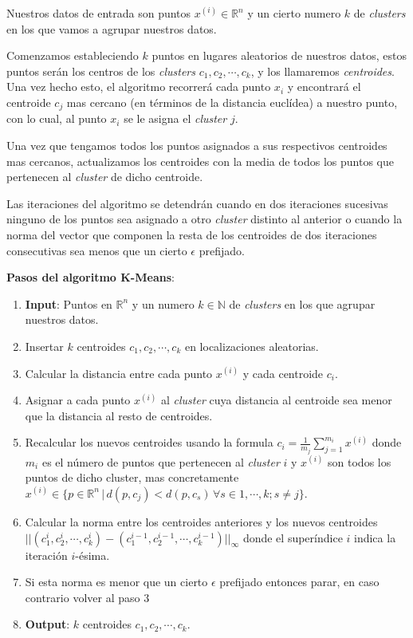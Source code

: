Nuestros datos de entrada son puntos $x^{(i)} \in \mathds{R}^n$ y un cierto numero $k$ de 
\textit{clusters} en los que vamos a agrupar nuestros datos.

Comenzamos estableciendo $k$ puntos en lugares aleatorios de nuestros datos, estos puntos serán los 
centros de los \textit{clusters} $c_1, c_2, \cdots, c_k$, y los llamaremos \textit{centroides}.
Una vez hecho esto, el algoritmo recorrerá cada punto $x_i$ y encontrará el centroide $c_j$ mas 
cercano (en términos de la distancia euclídea) a nuestro punto, con lo cual, al punto $x_i$ se le 
asigna el \textit{cluster} $j$.

Una vez que tengamos todos los puntos asignados a sus respectivos centroides mas cercanos, actualizamos 
los centroides con la media de todos los puntos que pertenecen al \textit{cluster} de dicho centroide.

Las iteraciones del algoritmo se detendrán cuando en dos iteraciones sucesivas ninguno de los puntos 
sea asignado a otro \textit{cluster} distinto al anterior o cuando la norma del vector que componen 
la resta de los centroides de dos iteraciones consecutivas sea menos que un cierto $\epsilon$ 
prefijado.
\newline

\noindent \textbf{Pasos del algoritmo K-Means}:
\begin{enumerate}
  \item \textbf{Input}: Puntos en $\mathds{R}^n$ y un numero $k \in \mathds{N}$ de \textit{clusters}
  en los que agrupar nuestros datos.
  \item Insertar $k$ centroides $c_1, c_2, \cdots, c_k$ en localizaciones aleatorias.
  \item Calcular la distancia entre cada punto $x^{(i)}$ y cada centroide $c_i$.
  \item Asignar a cada punto $x^{(i)}$ al \textit{cluster} cuya distancia al centroide sea menor 
        que la distancia al resto de centroides.
  \item Recalcular los nuevos centroides usando la formula $c_i = \frac{1}{m_j} \sum_{j=1}^{m_i}x^{(i)}$ 
        donde $m_i$ es el número de puntos que pertenecen al \textit{cluster} $i$ y $x^{(i)}$ son 
        todos los puntos de dicho cluster, mas concretamente \\
        $x^{(i)} \in \{ p \in \mathds{R}^n \, | \, d(p, c_j) < d(p, c_s) \, \forall s \in 1, \cdots, k; s \neq j \}$.
  \item Calcular la norma entre los centroides anteriores y los nuevos centroides \\
        $ ||(c_1^i, c_2^i, \cdots, c_k^i) - (c_1^{i-1}, c_2^{i-1}, \cdots, c_k^{i-1})||_{\infty} $ 
        donde el superíndice $i$ indica la iteración $i$-ésima.
  \item Si esta norma es menor que un cierto $\epsilon$ prefijado entonces parar, en caso contrario 
        volver al paso $3$        
  \item \textbf{Output}: $k$ centroides $c_1, c_2, \cdots, c_k$.
\end{enumerate}


